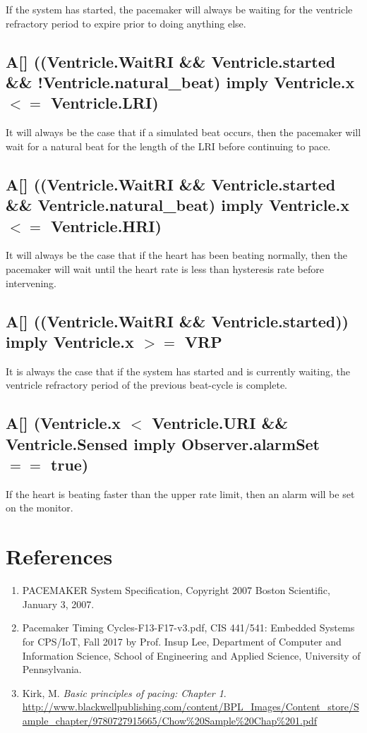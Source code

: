 \documentclass[10pt]{article}
\begin{document}
	If the system has started, the pacemaker will always be waiting for the ventricle refractory period to expire prior to doing anything else.

	\subsection{A[] ((Ventricle.WaitRI \&\& Ventricle.started \&\& !Ventricle.natural\_beat) imply Ventricle.x $<=$ Ventricle.LRI)}

	It will always be the case that if a simulated beat occurs, then the pacemaker will wait for a natural beat for the length of the LRI before continuing to pace.

	\subsection{A[] ((Ventricle.WaitRI \&\& Ventricle.started \&\& Ventricle.natural\_beat) imply Ventricle.x $<=$ Ventricle.HRI)}

It will always be the case that if the heart has been beating normally, then the pacemaker will wait until the heart rate is less than hysteresis rate before intervening.

	\subsection{A[] ((Ventricle.WaitRI \&\& Ventricle.started)) imply Ventricle.x $>=$ VRP}

	It is always the case that if the system has started and is currently waiting, the ventricle refractory period of the previous beat-cycle is complete.

	\subsection{A[] (Ventricle.x $<$ Ventricle.URI \&\& Ventricle.Sensed imply Observer.alarmSet $==$ true)}

	If the heart is beating faster than the upper rate limit, then an alarm will be set on the monitor. 

\section{References}

	\begin{enumerate}
		\item PACEMAKER System Specification, Copyright 2007 Boston Scientific, January 3, 2007.
		\item Pacemaker Timing Cycles-F13-F17-v3.pdf, CIS 441/541: Embedded Systems for CPS/IoT, Fall 2017 by Prof. Insup Lee, Department of Computer and Information Science, School of Engineering and Applied Science, University of Pennsylvania.
		\item Kirk, M. \textit{Basic principles of pacing: Chapter 1}. \url{http://www.blackwellpublishing.com/content/BPL\_Images/Content\_store/Sample\_chapter/9780727915665/Chow%20Sample%20Chap%201.pdf}
	\end{enumerate}


	
\end{document}
